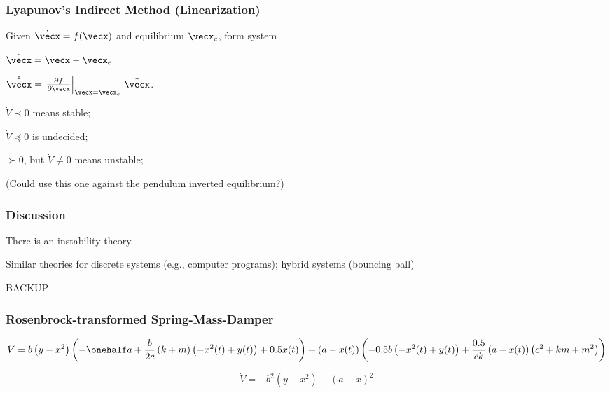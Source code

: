 \documentclass[12pt]{beamer}
\begin{document}

\begin{frame}
\frametitle{Lyapunov's Indirect Method (Linearization)}

Given $\dot \vecx = f(\vecx)$ and equilibrium $\vecx_e$,
form system

$\tilde\vecx = \vecx - \vecx_e$

$\dot{\tilde\vecx}
	= \left.
		\frac{\partial f }{\partial\vecx} \right|_{\vecx=\vecx_e}
		\, \tilde\vecx$.



$\dot V \prec 0$ means stable;

$\dot V \preceq 0$ is undecided;

$\dot \succ 0$, but $\dot V \neq 0$ means unstable;

(Could use this one against the pendulum inverted equilibrium?)

\end{frame}




\begin{frame}
\frametitle{Discussion}

\begin{itemize}
\vitem
There is an instability theory

\vitem
Similar theories for discrete systems (e.g., computer programs);
hybrid systems (bouncing ball)
\end{itemize}



\end{frame}









\begin{frame}
BACKUP
\end{frame}








\begin{frame}
\frametitle{Rosenbrock-transformed Spring-Mass-Damper}

\begin{equation}
V = b \left( y - x^{2}\right)
	\left(
		-\onehalf a + \frac{b}{2c} \left(k + m\right) \left(- x^{2}{\left (t \right )} + y{\left (t \right )}\right) + 0.5 x{\left (t \right )}\right)
		+ \left(a - x{\left (t \right )}\right) \left(- 0.5 b \left(- x^{2}{\left (t \right )} + y{\left (t \right )}\right) + \frac{0.5}{c k} \left(a - x{\left (t \right )}\right) \left(c^{2} + k m + m^{2}\right)\right)
\end{equation}

\begin{equation}
\dot V = -b^2 \left( y - x^2 \right) - \left( a - x \right)^2
\end{equation}

\end{frame}
\end{document}
